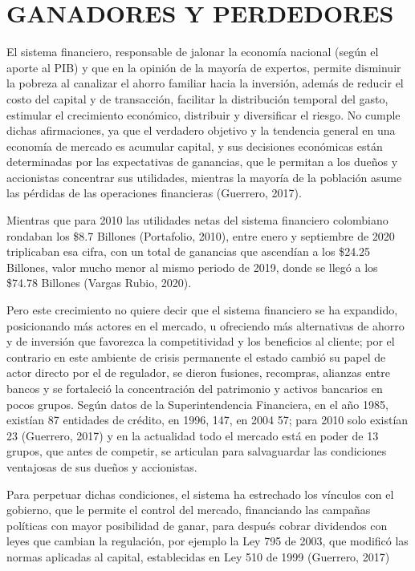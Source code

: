 \documentclass[
]{book}
\begin{document}
\hypertarget{ganadores-y-perdedores}{%
\chapter{GANADORES Y PERDEDORES}\label{ganadores-y-perdedores}}

El sistema financiero, responsable de jalonar la economía nacional (según el aporte al PIB) y que en la opinión de la mayoría de expertos, permite disminuir la pobreza al canalizar el ahorro familiar hacia la inversión, además de reducir el costo del capital y de transacción, facilitar la distribución temporal del gasto, estimular el crecimiento económico, distribuir y diversificar el riesgo. No cumple dichas afirmaciones, ya que el verdadero objetivo y la tendencia general en una economía de mercado es acumular capital, y sus decisiones económicas están determinadas por las expectativas de ganancias, que le permitan a los dueños y accionistas concentrar sus utilidades, mientras la mayoría de la población asume las pérdidas de las operaciones financieras (Guerrero, 2017).

Mientras que para 2010 las utilidades netas del sistema financiero colombiano rondaban los \$8.7 Billones (Portafolio, 2010), entre enero y septiembre de 2020 triplicaban esa cifra, con un total de ganancias que ascendían a los \$24.25 Billones, valor mucho menor al mismo periodo de 2019, donde se llegó a los \$74.78 Billones (Vargas Rubio, 2020).

Pero este crecimiento no quiere decir que el sistema financiero se ha expandido, posicionando más actores en el mercado, u ofreciendo más alternativas de ahorro y de inversión que favorezca la competitividad y los beneficios al cliente; por el contrario en este ambiente de crisis permanente el estado cambió su papel de actor directo por el de regulador, se dieron fusiones, recompras, alianzas entre bancos y se fortaleció la concentración del patrimonio y activos bancarios en pocos grupos. Según datos de la Superintendencia Financiera, en el año 1985, existían 87 entidades de crédito, en 1996, 147, en 2004 57; para 2010 solo existían 23 (Guerrero, 2017) y en la actualidad todo el mercado está en poder de 13 grupos, que antes de competir, se articulan para salvaguardar las condiciones ventajosas de sus dueños y accionistas.

Para perpetuar dichas condiciones, el sistema ha estrechado los vínculos con el gobierno, que le permite el control del mercado, financiando las campañas políticas con mayor posibilidad de ganar, para después cobrar dividendos con leyes que cambian la regulación, por ejemplo la Ley 795 de 2003, que modificó las normas aplicadas al capital, establecidas en Ley 510 de 1999 (Guerrero, 2017)
\end{document}
